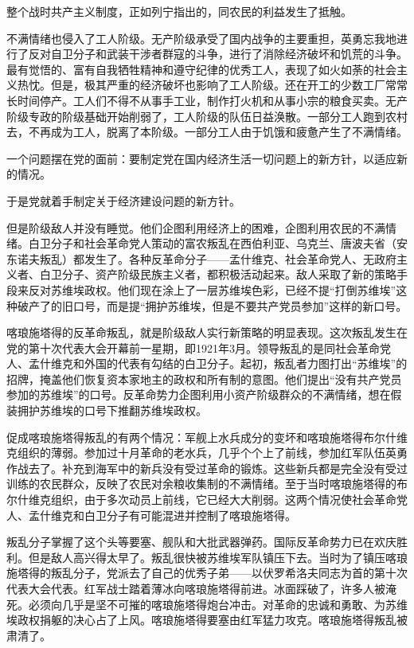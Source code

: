 整个战时共产主义制度，正如列宁指出的，同农民的利益发生了抵触。

不满情绪也侵入了工人阶级。无产阶级承受了国内战争的主要重担，英勇忘我地进行了反对自卫分子和武装干涉者群寇的斗争，进行了消除经济破坏和饥荒的斗争。最有觉悟的、富有自我牺牲精神和遵守纪律的优秀工人，表现了如火如荼的社会主义热忱。但是，极其严重的经济破坏也影响了工人阶级。还在开工的少数工厂常常长时间停产。工人们不得不从事手工业，制作打火机和从事小宗的粮食买卖。无产阶级专政的阶级基础开始削弱了，工人阶级的队伍日益涣散。一部分工人跑到农村去，不再成为工人，脱离了本阶级。一部分工人由于饥饿和疲惫产生了不满情绪。

一个问题摆在党的面前：要制定党在国内经济生活一切问题上的新方针，以适应新的情况。

于是党就着手制定关于经济建设问题的新方针。

但是阶级敌人并没有睡觉。他们企图利用经济上的困难，企图利用农民的不满情绪。白卫分子和社会革命党人策动的富农叛乱在西伯利亚、乌克兰、唐波夫省（安东诺夫叛乱）都发生了。各种反革命分子——孟什维克、社会革命党人、无政府主义者、白卫分子、资产阶级民族主义者，都积极活动起来。敌人采取了新的策略手段来反对苏维埃政权。他们现在涂上了一层苏维埃色彩，已经不提“打倒苏维埃”这种破产了的旧口号，而是提“拥护苏维埃，但是不要共产党员参加”这样的新口号。

喀琅施塔得的反革命叛乱，就是阶级敌人实行新策略的明显表现。这次叛乱发生在党的第十次代表大会开幕前一星期，即1921年3月。领导叛乱的是同社会革命党人、孟什维克和外国的代表有勾结的白卫分子。起初，叛乱者力图打出“苏维埃”的招牌，掩盖他们恢复资本家地主的政权和所有制的意图。他们提出“没有共产党员参加的苏维埃”的口号。反革命势力企图利用小资产阶级群众的不满情绪，想在假装拥护苏维埃的口号下推翻苏维埃政权。

促成喀琅施塔得叛乱的有两个情况：军舰上水兵成分的变坏和喀琅施塔得布尔什维克组织的薄弱。参加过十月革命的老水兵，几乎个个上了前线，参加红军队伍英勇作战去了。补充到海军中的新兵没有受过革命的锻炼。这些新兵都是完全没有受过训练的农民群众，反映了农民对余粮收集制的不满情绪。至于当时喀琅施塔得的布尔什维克组织，由于多次动员上前线，它已经大大削弱。这两个情况使社会革命党人、孟什维克和白卫分子有可能混进并控制了喀琅施塔得。

叛乱分子掌握了这个头等要塞、舰队和大批武器弹药。国际反革命势力已在欢庆胜利。但是敌人高兴得太早了。叛乱很快被苏维埃军队镇压下去。当时为了镇压喀琅施塔得的叛乱分子，党派去了自己的优秀子弟——以伏罗希洛夫同志为首的第十次代表大会代表。红军战士踏着薄冰向喀琅施塔得前进。冰面踩破了，许多人被淹死。必须向几乎是坚不可摧的喀琅施塔得炮台冲击。对革命的忠诚和勇敢、为苏维埃政权捐躯的决心占了上风。喀琅施塔得要塞由红军猛力攻克。喀琅施塔得叛乱被肃清了。


